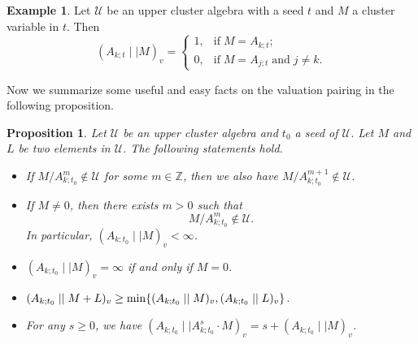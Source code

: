 \documentclass{amsart}
\newtheorem{proposition}[theorem]{Proposition}
\theoremstyle{definition}
\newtheorem{example}[theorem]{Example}
\theoremstyle{remark}
\numberwithin{equation}{section}
\begin{document}
\begin{example}
Let $\mathcal U$ be an upper cluster algebra with a seed $t$ and  $M$ a cluster variable in $t$. Then $$(A_{k;t}\mid\mid  M)_v=\begin{cases}1,&\text{if}\;M=A_{k;t};\\0,&\text{if}\;M=A_{j;t}\;\text{and}\;j\neq k.\end{cases}$$
\end{example}


Now we summarize some useful and easy facts on the valuation pairing in the following proposition.

\begin{proposition}\label{proind}
  Let $\mathcal U$ be an upper cluster algebra and $t_0$ a seed of $\mathcal U$.  Let $M$ and $L$ be two elements in $\mathcal U$. The following statements hold.
  \begin{itemize}
  \item[(i)] If $M/A_{k;t_0}^m\notin \mathcal U$ for some $m\in\mathbb Z$, then we also have $M/A_{k;t_0}^{m+1}\notin \mathcal U$.
  \item[(ii)] If $M\neq 0$, then there exists $m>0$ such that $$M/A_{k;t_0}^m\notin \mathcal U.$$ In particular,
  $(A_{k;t_0}\mid\mid  M)_v<\infty$.
  \item[(iii)] $(A_{k;t_0}\mid\mid  M)_v=\infty$ if and only if $M=0$.
  \item[(iv)] $(A_{k;t_0}\mid\mid  M+L)_v\geq{\rm min}\{(A_{k;t_0}\mid\mid  M)_v,(A_{k;t_0}\mid\mid  L)_v\}$.

\item[(v)] For any $s\geq 0$, we have $(A_{k;t_0}\mid\mid   A_{k;t_0}^s\cdot M)_v=s+(A_{k;t_0}\mid\mid  M)_v$.
  \end{itemize}
\end{proposition}
\end{document}
